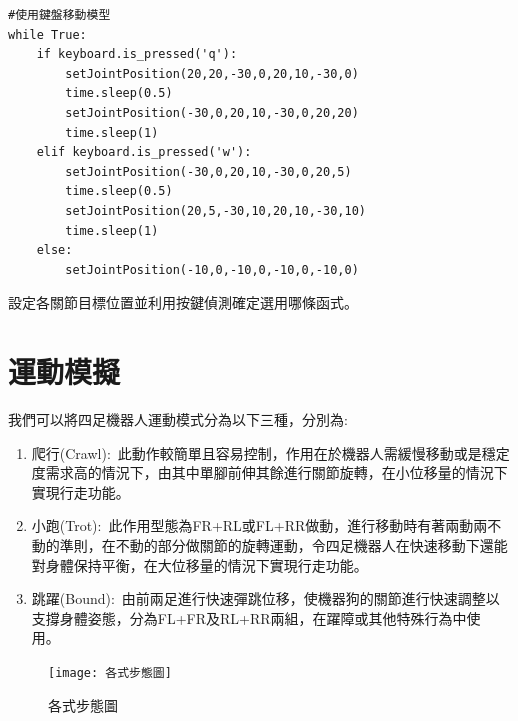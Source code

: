 \label{鍵盤控制及角度設定}
\begin{lstlisting}[caption=\Large 鍵盤控制及角度設定]
#使用鍵盤移動模型
while True:
    if keyboard.is_pressed('q'):
        setJointPosition(20,20,-30,0,20,10,-30,0)
        time.sleep(0.5)
        setJointPosition(-30,0,20,10,-30,0,20,20)
        time.sleep(1)
    elif keyboard.is_pressed('w'):
        setJointPosition(-30,0,20,10,-30,0,20,5)
        time.sleep(0.5)
        setJointPosition(20,5,-30,10,20,10,-30,10)
        time.sleep(1)
    else:
        setJointPosition(-10,0,-10,0,-10,0,-10,0)
\end{lstlisting}
設定各關節目標位置並利用按鍵偵測確定選用哪條函式。\\

\section{運動模擬}
我們可以將四足機器人運動模式分為以下三種，分別為:\\

\begin{enumerate}
\item 爬行(Crawl):\
此動作較簡單且容易控制，作用在於機器人需緩慢移動或是穩定度需求高的情況下，由其中單腳前伸其餘進行關節旋轉，在小位移量的情況下實現行走功能。\
\item 小跑(Trot):\
此作用型態為FR+RL或FL+RR做動，進行移動時有著兩動兩不動的準則，在不動的部分做關節的旋轉運動，令四足機器人在快速移動下還能對身體保持平衡，在大位移量的情況下實現行走功能。\
\item 跳躍(Bound):\
由前兩足進行快速彈跳位移，使機器狗的關節進行快速調整以支撐身體姿態，分為FL+FR及RL+RR兩組，在躍障或其他特殊行為中使用。\
\end{enumerate}
\begin{figure}[hbt!]
\center
\texttt{[image: 各式步態圖]}
\caption{\Large 各式步態圖}\label{各式步態圖}
\end{figure}
\newpage


